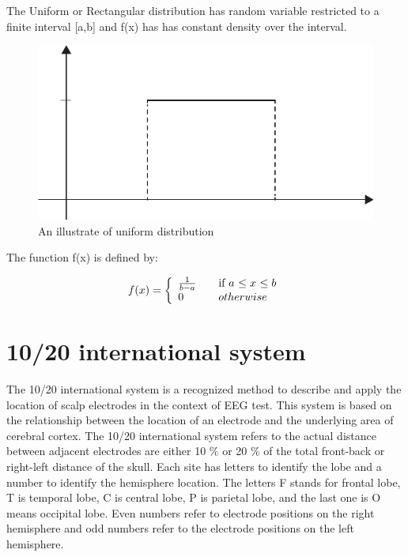 \hspace{1.5cm} The Uniform or Rectangular distribution has random variable  restricted to a finite interval [a,b] and f(x) has  has constant density over the interval.

\begin{figure}[ht]
	\centering
	\includegraphics[scale = 0.8]{chapter3/34.pdf}
	\caption{An illustrate of uniform distribution}
\end{figure}

The function f(x) is defined by:

\begin{equation}\label{2}
f(x) = \left\{ 
\begin{array}{l l}
  {1 \over b-a} & \quad \mbox{if $a$ $\leq x$ $\leq b$}\\
  0 & \quad \mbox{$otherwise$}\\ \end{array} \right.
\end{equation}

\section{10/20 international system}
\hspace{1.5cm} The 10/20 international system is a recognized method to describe and apply the location of scalp electrodes in the context of EEG test. This system is based on the relationship between the location of an electrode and the underlying area of cerebral cortex. The 10/20 international system refers to the actual distance between adjacent electrodes are either 10 \% or 20 \% of the total front-back or right-left distance of the skull. Each site has letters to identify the lobe and a number to identify the hemisphere location. The letters F stands for frontal lobe, T is temporal lobe, C is central lobe, P is parietal lobe, and the last one is O means occipital lobe. Even numbers refer to electrode positions on the right hemisphere and odd numbers refer to the electrode positions on the left hemisphere.

